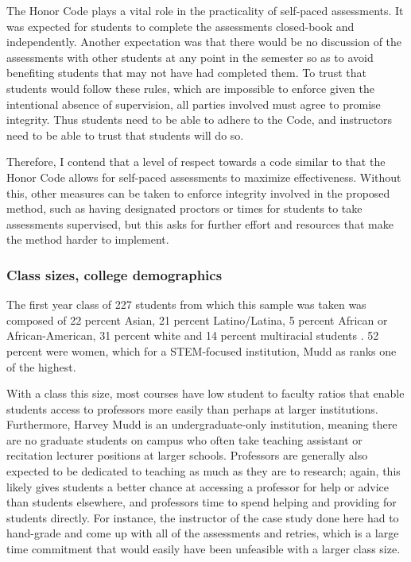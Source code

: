 The Honor Code plays a vital role in the practicality of self-paced assessments. It was expected for students to complete the assessments closed-book and independently. Another expectation was that there would be no discussion of the assessments with other students at any point in the semester so as to avoid benefiting students that may not have had completed them. To trust that students would follow these rules, which are impossible to enforce given the intentional absence of supervision, all parties involved must agree to promise integrity. Thus students need to be able to adhere to the Code, and instructors need to be able to trust that students will do so.

Therefore, I contend that a level of respect towards a code similar to that the Honor Code allows for self-paced assessments to maximize effectiveness. Without this, other measures can be taken to enforce integrity involved in the proposed method, such as having designated proctors or times for students to take assessments supervised, but this asks for further effort and resources that make the method harder to implement.

\subsubsection{Class sizes, college demographics}
The first year class of 227 students from which this sample was taken was composed of 22 percent Asian, 21 percent Latino/Latina, 5 percent African or African-American, 31 percent white and 14 percent multiracial students \citep{hmc}. 52 percent were women, which for a STEM-focused institution, Mudd as ranks one of the highest.

With a class this size, most courses have low student to faculty ratios that enable students access to professors more easily than perhaps at larger institutions. Furthermore, Harvey Mudd is an undergraduate-only institution, meaning there are no graduate students on campus who often take teaching assistant or recitation lecturer positions at larger schools. Professors are generally also expected to be dedicated to teaching as much as they are to research; again, this likely gives students a better chance at accessing a professor for help or advice than students elsewhere, and professors time to spend helping and providing for students directly. For instance, the instructor of the case study done here had to hand-grade and come up with all of the assessments and retries, which is a large time commitment that would easily have been unfeasible with a larger class size.

